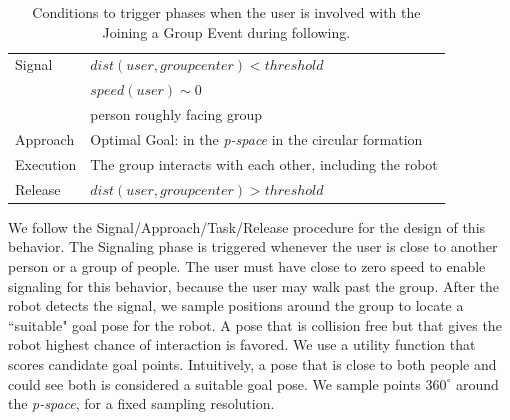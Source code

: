 \begin{table}[ht!]

    \caption{Conditions to trigger phases when the user is involved with the Joining a Group Event during following.}

    \centering
    	
  \begin{tabular}{l |  m{10cm}}    
    \toprule    
    Signal & {$dist(user, groupcenter)<threshold$}\\       
	                           & {$speed(user)\sim 0$} \\
	                           & {person roughly facing group}\\ \midrule		                           		                                
    Approach & {Optimal Goal: in the \textit{p-space} in the circular formation}\\       \midrule
    Execution & {The group interacts with each other, including the robot}\\  \midrule
    Release & {$dist(user, groupcenter)>threshold$}\\ 
    \bottomrule
  \end{tabular}
    \label{table:situation_aware_list_group}
\end{table}

We follow the Signal/Approach/Task/Release procedure for the design of this behavior. The Signaling phase is triggered whenever the user is close to another person or a group of people. The user must have close to zero speed to enable signaling for this behavior, because the user may walk past the group. After the robot detects the signal, we sample positions around the group to locate a ``suitable" goal pose for the robot. A pose that is collision free but that gives the robot highest chance of interaction is favored. We use a utility function that scores candidate goal points. Intuitively, a pose that is close to both people and could see both is considered a suitable goal pose. We sample points $360^{\circ}$ around the \textit{p-space}, for a fixed sampling resolution. 

